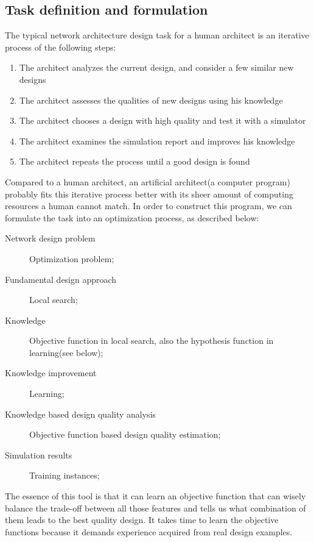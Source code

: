 \documentclass[12pt]{article}
\theoremstyle{definition}
\begin{document}
\subsection{Task definition and formulation}
The typical network architecture design task for a human architect is an iterative process of the following steps:
\begin{enumerate}
\item{The architect analyzes the current design, and consider a few similar new designs}
\item{The architect assesses the qualities of new designs using his knowledge}
\item{The architect chooses a design with high quality and test it with a simulator}
\item{The architect examines the simulation report and improves his knowledge}
\item{The architect repeats the process until a good design is found}
\end{enumerate}
Compared to a human architect, an artificial architect(a computer program) probably fits this iterative process better with its sheer amount of computing resources a human cannot match. In order to construct this program, we can formulate the task into an optimization process, as described below:
\begin{description}
  \item[Network design problem] Optimization problem;
  \item[Fundamental design approach] Local search;
  \item[Knowledge] Objective function in local search, also the hypothesis function in learning(see below);
  \item[Knowledge improvement] Learning;
  \item[Knowledge based design quality analysis] Objective function based design quality estimation;
  \item[Simulation results] Training instances;
\end{description}
The essence of this tool is that it can learn an objective function that can wisely balance the trade-off between all those features and tells us what combination of them leads to the best quality design. It takes time to learn the objective functions because it demands experience acquired from real design examples.
\end{document}
